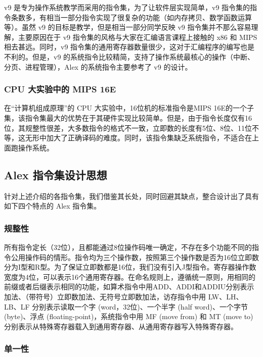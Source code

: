 \documentclass[11pt, a4paper]{article}
\begin{document}
v9 是专为操作系统教学而采用的指令集，为了让软件层实现简单，v9 指令集的指令条数多，有相当一部分指令实现了很复杂的功能（如内存拷贝、数学函数运算等）。虽然 v9 的目标是教学，但是相当一部分同学反映 v9 指令集并不那么容易理解，主要原因在于 v9 指令集的风格与大家在汇编语言课程上接触的 x86 和 MIPS 相去甚远。同时，v9 指令集的通用寄存器数量很少，这对于汇编程序的编写也是不利的。但是，v9 的系统指令比较精简，支持了操作系统最核心的操作（中断、分页、进程管理），Alex 的系统指令主要参考了 v9 的设计。

\subsubsection{CPU 大实验中的 MIPS 16E}

在“计算机组成原理”的 CPU 大实验中，16位机的标准指令是MIPS 16E的一个子集，该指令集最大的优势在于其硬件实现比较简单。但是，由于指令长度仅有16位，其规整性很差，大多数指令的格式不一致，立即数的长度有5位、8位、11位不等，这无形中加大了正确译码的难度。同时，该指令集缺乏系统指令，不适合在上面跑操作系统。

\subsection{Alex 指令集设计思想}

针对上述介绍的各指令集，我们借鉴其长处，同时回避其缺点，整合设计出了具有如下四个特点的 Alex 指令集。

\subsubsection{规整性}

所有指令定长（32位），且都能通过8位操作码唯一确定，不存在多个功能不同的指令公用操作码的情形。指令均为三个操作数，按照第三个操作数是否为16位立即数分为I型和R型。为了保证立即数都是16位，我们没有引入J型指令。寄存器操作数宽度为4位，可以表示16个通用寄存器。在命名规则上，遵循统一原则，用相同的前缀或者后缀表示相同的功能，如算术指令中用ADD、ADDI和ADDIU分别表示加法、（带符号）立即数加法、无符号立即数加法，访存指令中用 LW、LH、LB、LF 分别表示读取一个字 (word，32位)、一个半字 (half word)、一个字节 (byte)、浮点 (floating-point)，系统指令中用 MF (move from) 和 MT (move to) 分别表示从特殊寄存器载入到通用寄存器、从通用寄存器写入特殊寄存器。

\subsubsection{单一性}
\end{document}
